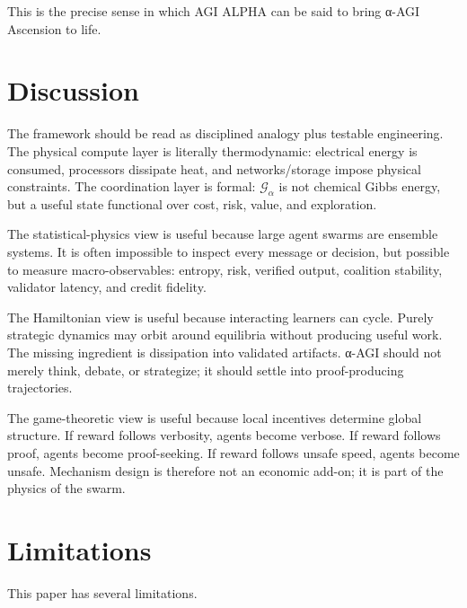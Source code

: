 \documentclass[
  11pt,
]{article}
\begin{document}
This is the precise sense in which AGI ALPHA can be said to bring α-AGI
Ascension to life.

\section{Discussion}\label{discussion}

The framework should be read as disciplined analogy plus testable
engineering. The physical compute layer is literally thermodynamic:
electrical energy is consumed, processors dissipate heat, and
networks/storage impose physical constraints. The coordination layer is
formal: \(\mathcal{G}_{\alpha}\) is not chemical Gibbs energy, but a
useful state functional over cost, risk, value, and exploration.

The statistical-physics view is useful because large agent swarms are
ensemble systems. It is often impossible to inspect every message or
decision, but possible to measure macro-observables: entropy, risk,
verified output, coalition stability, validator latency, and credit
fidelity.

The Hamiltonian view is useful because interacting learners can cycle.
Purely strategic dynamics may orbit around equilibria without producing
useful work. The missing ingredient is dissipation into validated
artifacts. α-AGI should not merely think, debate, or strategize; it
should settle into proof-producing trajectories.

The game-theoretic view is useful because local incentives determine
global structure. If reward follows verbosity, agents become verbose. If
reward follows proof, agents become proof-seeking. If reward follows
unsafe speed, agents become unsafe. Mechanism design is therefore not an
economic add-on; it is part of the physics of the swarm.

\section{Limitations}\label{limitations}

This paper has several limitations.
\end{document}
